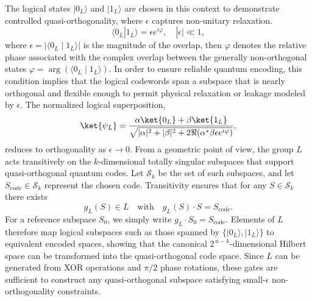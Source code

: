 \documentclass{iopjournal}
\theoremstyle{thmstyleone}%
\theoremstyle{thmstyletwo}%
\theoremstyle{thmstylethree}%
\begin{document}
The logical states $|0_L\rangle$ and $|1_L\rangle$ are chosen in this context to demonstrate controlled quasi-orthogonality, where $\epsilon$ captures non-unitary relaxation. \begin{equation} \langle 0_L | 1_L \rangle = \epsilon e^{i\varphi}, \quad |\epsilon| \ll 1, \label{codewords quasi} \end{equation} 
where $\epsilon = |\langle 0_L \mid 1_L \rangle|$ is the magnitude of the overlap, then $\varphi$ denotes the relative phase associated with the complex overlap between the generally non-orthogonal states $\varphi = \arg\left(\langle 0_L \mid 1_L \rangle\right)$.
In order to ensure reliable quantum encoding, this condition implies that the logical codewords span a subspace that is nearly orthogonal and flexible enough to permit physical relaxation or leakage modeled by $\epsilon$.
The normalized logical superposition,
\begin{equation}
\ket{\psi_L} = 
\frac{\alpha \ket{0_L} + \beta \ket{1_L}}
{\sqrt{|\alpha|^2 + |\beta|^2 + 2 \Re(\alpha^* \beta \epsilon e^{i\varphi})}},\label{logical state}
\end{equation}
reduces to orthogonality as $\epsilon \to 0$. 
From a geometric point of view, the group \(L\) acts transitively on the \(k\)-dimensional totally singular subspaces that support quasi-orthogonal quantum codes. Let \(\mathcal{S}_k\) be the set of such subspaces, and let \(S_{\mathrm{code}} \in \mathcal{S}_k\) represent the chosen code. Transitivity ensures that for any \(S \in \mathcal{S}_k\) there exists
\[g_L(S) \in L \quad \text{with} \quad g_L(S)\cdot S = S_{\mathrm{code}}.\]
For a reference subspace \(S_0\), we simply write
$g_L\cdot S_0 = S_{\mathrm{code}}$. Elements of \(L\) therefore map logical subspaces such as those spanned by \(\{|0_L\rangle, |1_L\rangle\}\) to equivalent encoded spaces, showing that the canonical \(2^{\,n-k}\)-dimensional Hilbert space can be transformed into the quasi-orthogonal code space. Since \(L\) can be generated from XOR operations and \(\pi/2\) phase rotations, these gates are sufficient to construct any quasi-orthogonal subspace satisfying small-\(\epsilon\) non-orthogonality constraints.


\medskip
\end{document}
